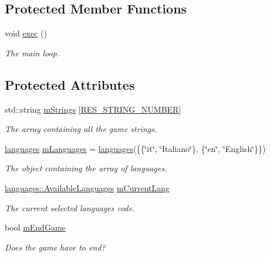 \subsection*{Protected Member Functions}
\begin{DoxyCompactItemize}
\item 
void \mbox{\hyperlink{classgame_af1ca264f9c412dc05d7e1d4cfcb3dac2}{exec}} ()
\begin{DoxyCompactList}\small\item\em The main loop. \end{DoxyCompactList}\end{DoxyCompactItemize}
\subsection*{Protected Attributes}
\begin{DoxyCompactItemize}
\item 
\mbox{\label{classgame_a5d2da7f031219641d99da18de74dffa0}} 
std\+::string \mbox{\hyperlink{classgame_a5d2da7f031219641d99da18de74dffa0}{m\+Strings}} \mbox{[}\mbox{\hyperlink{classgame_a750823afdadfbde9c945b9d0703c499da9fc16aaae3b7622481465a27e7908aa6}{R\+E\+S\+\_\+\+S\+T\+R\+I\+N\+G\+\_\+\+N\+U\+M\+B\+ER}}\mbox{]}
\begin{DoxyCompactList}\small\item\em The array containing all the game strings. \end{DoxyCompactList}\item 
\mbox{\label{classgame_ac4c8377dc422cb94c3761512d7afddac}} 
\mbox{\hyperlink{classgame_1_1languages}{languages}} \mbox{\hyperlink{classgame_ac4c8377dc422cb94c3761512d7afddac}{m\+Languages}} = \mbox{\hyperlink{classgame_1_1languages}{languages}}(\{\{\char`\"{}it\char`\"{}, \char`\"{}Italiano\char`\"{}\}, \{\char`\"{}en\char`\"{}, \char`\"{}English\char`\"{}\}\})
\begin{DoxyCompactList}\small\item\em The object containing the array of languages. \end{DoxyCompactList}\item 
\mbox{\label{classgame_a0ca92da64583b5e8b4fa03153fabf8b7}} 
\mbox{\hyperlink{classgame_1_1languages_ad965ce3a9fdce02ab3caba6301f221eb}{languages\+::\+Available\+Languages}} \mbox{\hyperlink{classgame_a0ca92da64583b5e8b4fa03153fabf8b7}{m\+Current\+Lang}}
\begin{DoxyCompactList}\small\item\em The current selected language\textquotesingle{}s code. \end{DoxyCompactList}\item 
\mbox{\label{classgame_a56f997f6d66853383a7766f859dbb14f}} 
bool \mbox{\hyperlink{classgame_a56f997f6d66853383a7766f859dbb14f}{m\+End\+Game}}
\begin{DoxyCompactList}\small\item\em Does the game have to end? \end{DoxyCompactList}\end{DoxyCompactItemize}
